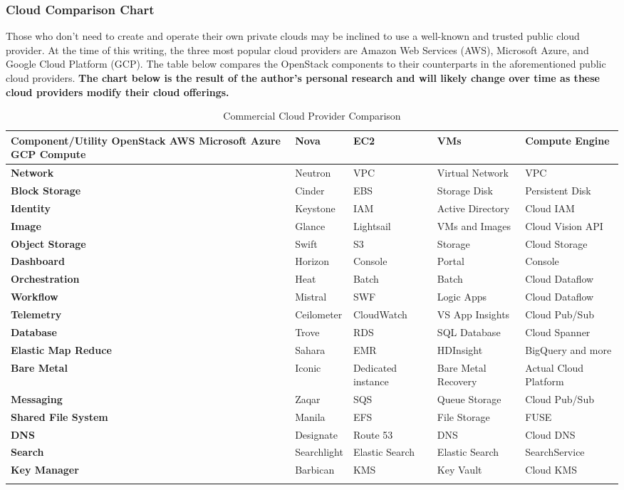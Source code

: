 \subsubsection{Cloud Comparison Chart}
Those who don’t need to create and operate their own private clouds may be
inclined to use a well-known and trusted public cloud provider. At the time of
this writing, the three most popular cloud providers are Amazon Web Services
(AWS), Microsoft Azure, and Google Cloud Platform (GCP). The table below
compares the OpenStack components to their counterparts in the aforementioned
public cloud providers. \textbf{The chart below is the result of the author’s
personal research and will likely change over time as these cloud providers
modify their cloud offerings.}

\begin{longtable}{LLLLL}
\toprule
\textbf{Component/Utility}
\textbf{OpenStack}
\textbf{AWS}
\textbf{Microsoft Azure}
\textbf{GCP}
\textbf{Compute}
&
Nova
&
EC2
&
VMs
&
Compute Engine
\\ \midrule
\textbf{Network}
&
Neutron
&
VPC
&
Virtual Network
&
VPC
\\ \midrule
\textbf{Block Storage}
&
Cinder
&
EBS
&
Storage Disk
&
Persistent Disk
\\ \midrule
\textbf{Identity}
&
Keystone
&
IAM
&
Active Directory
&
Cloud IAM
\\ \midrule
\textbf{Image}
&
Glance
&
Lightsail
&
VMs and Images
&
Cloud Vision API
\\ \midrule
\textbf{Object Storage}
&
Swift
&
S3
&
Storage
&
Cloud Storage
\\ \midrule
\textbf{Dashboard}
&
Horizon
&
Console
&
Portal
&
Console
\\ \midrule
\textbf{Orchestration}
&
Heat
&
Batch
&
Batch
&
Cloud Dataflow
\\ \midrule
\textbf{Workflow}
&
Mistral
&
SWF
&
Logic Apps
&
Cloud Dataflow
\\ \midrule
\textbf{Telemetry}
&
Ceilometer
&
CloudWatch
&
VS App Insights
&
Cloud Pub/Sub
\\ \midrule
\textbf{Database}
&
Trove
&
RDS
&
SQL Database
&
Cloud Spanner
\\ \midrule
\textbf{Elastic Map Reduce}
&
Sahara
&
EMR
&
HDInsight
&
BigQuery and more
\\ \midrule
\textbf{Bare Metal}
&
Iconic
&
Dedicated instance
&
Bare Metal Recovery
&
Actual Cloud Platform
\\ \midrule
\textbf{Messaging}
&
Zaqar
&
SQS
&
Queue Storage
&
Cloud Pub/Sub
\\ \midrule
\textbf{Shared File System}
&
Manila
&
EFS
&
File Storage
&
FUSE
\\ \midrule
\textbf{DNS}
&
Designate
&
Route 53
&
DNS
&
Cloud DNS
\\ \midrule
\textbf{Search}
&
Searchlight
&
Elastic Search
&
Elastic Search
&
SearchService
\\ \midrule
\textbf{Key Manager}
&
Barbican
&
KMS
&
Key Vault
&
Cloud KMS
\\
\bottomrule
\caption{Commercial Cloud Provider Comparison}
\end{longtable}
